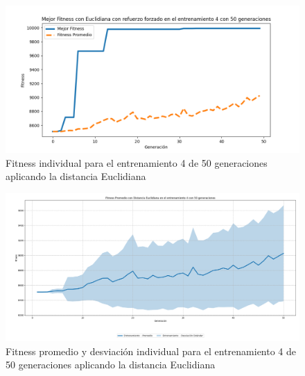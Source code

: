 \documentclass[conference]{IEEEtran}
\begin{document}
\begin{figure}[H]
    \centering
    \includegraphics[width=0.9\linewidth]{Euclidiana/Fitnes_individual/Fitness_4_Eucli_50Gen.png}
    \caption{Fitness individual para el entrenamiento 4 de 50 generaciones aplicando la distancia Euclidiana}
    \label{fig:Fitnes_ecu_4_50_inv}
\end{figure}
\begin{figure}[H]
    \centering
    \includegraphics[width=0.9\linewidth]{Euclidiana/Fitnes_individual/Fitness_4_Eucli_50Gen_Sombra.png}
    \caption{Fitness promedio y desviación individual para el entrenamiento 4 de 50 generaciones aplicando la distancia Euclidiana}
    \label{fig:Fitnes_ecu_4_50_inv_sombra}
\end{figure}

\end{document}
